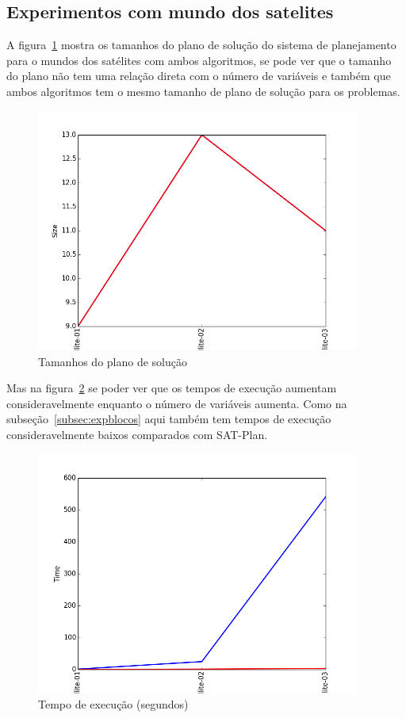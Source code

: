 \subsection{Experimentos com mundo dos satelites}
\label{subsec:expsatelites}
	A figura~\ref{fig:satsize} mostra os tamanhos do plano de solução do sistema de planejamento para o mundos dos satélites com ambos algoritmos, se pode ver que o tamanho do plano não tem uma relação direta com o número de variáveis e também que ambos algoritmos tem o mesmo tamanho de plano de solução para os problemas.
		\begin{figure}[H]
			\centering
			\includegraphics[height=8cm]{images/satellite_size}
			\caption{Tamanhos do plano de solução}
			\label{fig:satsize}
		\end{figure}
	Mas na figura~\ref{fig:sattime} se poder ver que os tempos de execução aumentam consideravelmente enquanto o número de variáveis aumenta. Como na subseção~\ref{subsec:expblocos} aqui também tem tempos de execução consideravelmente baixos comparados com SAT-Plan.
		\begin{figure}[H]
			\centering
			\includegraphics[height=8cm]{images/satellite_time}
			\caption{Tempo de execução (segundos)}
			\label{fig:sattime}
		\end{figure}
